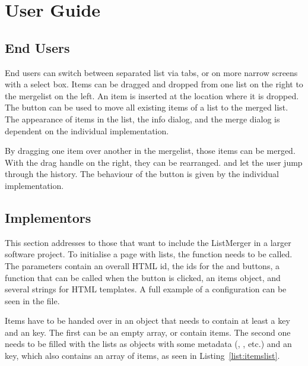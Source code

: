 %
%
% 
% 
% 

\chapter{User Guide}
\label{chap:userguide}

\TODO{}


\section{End Users}

End users can switch between separated list via tabs, or on more narrow
screens with a select box. Items can be dragged and dropped from one
list on the right to the mergelist on the left. An item is inserted at
the location where it is dropped. The  button can be
used to move all existing items of a list to the merged list. The
appearance of items in the list, the info dialog, and the merge dialog
is dependent on the individual implementation.

By dragging one item over another in the mergelist, those items can be
merged. With the drag handle on the right, they can be rearranged.
 and  let the user jump through the history.
The behaviour of the  button is given by the individual
implementation.







\section{Implementors}

This section addresses to those that want to include the ListMerger in a
larger software project. To initialise a page with lists, the
 function needs to be called. The parameters contain
an overall HTML id, the ids for the  and 
buttons, a function that can be called when the  button is
clicked, an items object, and several strings for HTML templates. A full
example of a configuration can be seen in the 
file.

Items have to be handed over in an object that needs to contain at least
a  key and an  key. The first can be an
empty array, or contain items. The second one needs to be filled with
the lists as objects with some metadata (, , etc.)
and an  key, which also contains an array of items, as seen
in Listing~\ref{list:itemslist}.



